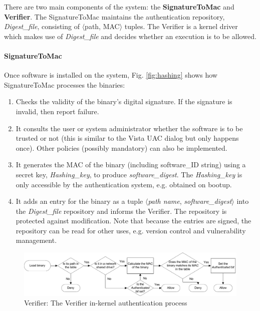 There are two main components of the system: the {\bf SignatureToMac} and {\bf Verifier}.
The SignatureToMac maintains the authentication repository, {\it Digest\_file}, 
consisting of $\langle$path, MAC$\rangle$ tuples.
The Verifier is a kernel driver which makes use of
{\it Digest\_file} and
decides whether an execution is to be allowed.

\paragraph{SignatureToMac}

Once software is installed on the system,
Fig. \ref{fig:hashing} shows how SignatureToMac processes the binaries:
\begin{enumerate}
\item Checks the validity of the binary's digital signature.
If the signature is invalid, then report failure.
\item It consults the user or system administrator whether 
the software is to be trusted or not (this is similar to the Vista UAC 
dialog but only happens once).
Other policies (possibly mandatory) can also be implemented.
\item It generates the MAC of the binary 
(including software\_ID string) using a secret key, {\it Hashing\_key}, 
to produce {\it software\_digest}.
The {\it Hashing\_key} is only accessible
by the authentication system, e.g. obtained on bootup.
\item It adds an entry for the binary as a tuple $\langle${\it path name}, 
{\it software\_digest}$\rangle$ into the {\it Digest\_file} repository
and informs the Verifier.
The repository is protected against modification. Note that because the entries
are signed, the repository can be read for other uses, e.g.
version control and vulnerability management.
\end{enumerate}


\begin{figure}[tb]
\begin{center}
\includegraphics[width=1.0\textwidth]{binauth/verifier}
\caption{Verifier: The Verifier in-kernel authentication process}
\label{fig:verifier}
\end{center}
\end{figure}


